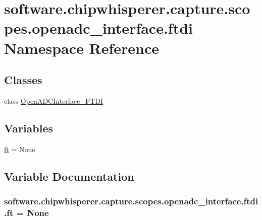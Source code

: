 \hypertarget{namespacesoftware_1_1chipwhisperer_1_1capture_1_1scopes_1_1openadc__interface_1_1ftdi}{}\section{software.\+chipwhisperer.\+capture.\+scopes.\+openadc\+\_\+interface.\+ftdi Namespace Reference}
\label{namespacesoftware_1_1chipwhisperer_1_1capture_1_1scopes_1_1openadc__interface_1_1ftdi}
\subsection*{Classes}
\begin{DoxyCompactItemize}
\item 
class \hyperlink{classsoftware_1_1chipwhisperer_1_1capture_1_1scopes_1_1openadc__interface_1_1ftdi_1_1OpenADCInterface__FTDI}{Open\+A\+D\+C\+Interface\+\_\+\+F\+T\+D\+I}
\end{DoxyCompactItemize}
\subsection*{Variables}
\begin{DoxyCompactItemize}
\item 
\hyperlink{namespacesoftware_1_1chipwhisperer_1_1capture_1_1scopes_1_1openadc__interface_1_1ftdi_ad9c76f7d9d92feea8f4965e9c7008d8a}{ft} = None
\end{DoxyCompactItemize}


\subsection{Variable Documentation}
\hypertarget{namespacesoftware_1_1chipwhisperer_1_1capture_1_1scopes_1_1openadc__interface_1_1ftdi_ad9c76f7d9d92feea8f4965e9c7008d8a}{}
\subsubsection[{ft}]{\setlength{\rightskip}{0pt plus 5cm}software.\+chipwhisperer.\+capture.\+scopes.\+openadc\+\_\+interface.\+ftdi.\+ft = None}\label{namespacesoftware_1_1chipwhisperer_1_1capture_1_1scopes_1_1openadc__interface_1_1ftdi_ad9c76f7d9d92feea8f4965e9c7008d8a}

